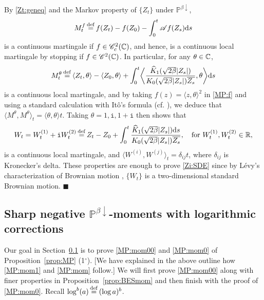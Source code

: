 \documentclass[12pt, twoside]{article}
\numberwithin{figure}{section}
\newcommand{\1}{\mathds 1}
\newcommand{\C}{{\mathscr C}}
\newcommand{\da}{{\downarrow}}
\newcommand{\la}{{\langle}}
\newcommand{\ra}{{\rangle}}
\newcommand{\ms}{\mathscr}
\renewcommand{\P}{{\mathbb P}}
\renewcommand{\d}{{\mathrm d}}
\newcommand{\R}{{\Bbb R}}
\newcommand{\2}{{\mathbf 1}}
\renewcommand{\i}{{\mathtt i}}
\newcommand{\defeq}{{\stackrel{\rm def}{=}}}
\renewenvironment{proof}[1][\proofname]{\noindent {\bfseries #1.}\;}{\hfill\ensuremath{\blacksquare}\\}
\newcommand{\cc}{{^\circ}}
\newcommand{\hK}{{\widehat{K}}}
\begin{document}
\begin{proof}[Proof of Proposition~\ref{prop:MP} (4$\cc$)]
By \eqref{Zt:geneq} and the Markov property of $\{Z_t\}$ under $\P^{\beta\da}$, 
\begin{align}\label{MP:f}
M_t^f\,\defeq \,f(Z_t)-f( Z_0) -\int_0^t\ms Af(Z_s)\d s
\end{align}
is a continuous martingale if $f\in \C_c^2(\Bbb C)$, and hence, is a continuous local martingale  by stopping if $f\in \C^2(\Bbb C)$. In particular, for any $\theta\in \Bbb C$,
\[
M^\theta_t\,\defeq\, \la Z_t,\theta\ra-\la Z_0,\theta\ra+\int_0^t 
 \biggl\langle\frac{\hK_1(\sqrt{2\beta}|Z_s|)}{K_0(\sqrt{2\beta}|Z_s|)\overline{Z_s}},\theta\biggr\rangle
\d s
\]
is a continuous local martingale, and by taking $f(z)=\la z,\theta\ra^2$ in \eqref{MP:f} and using a standard calculation with It\^{o}'s formula (cf. \cite[the proof of (i) $\Rightarrow$ (ii) of (2.4)~Proposition, p.297]{RY}), we deduce that $\la M^\theta,M^\theta\ra_t=\la \theta,\theta\rangle t$.  Taking $\theta=1,\i,1+\i$ then shows that
\[
W_t=W^{(1)}_t+\i W^{(2)}_t\,\defeq\, Z_t-Z_0+\int_0^t \frac{\hK_1(\sqrt{2\beta}|Z_s|)\d s}{K_0(\sqrt{2\beta}|Z_s|)\overline{Z_s}},\quad \mbox{for $W^{(1)}_t,W^{(2)}_t\in \R$},
\]
is a continuous local martingale, and $\la W^{(i)},W^{(j)}\ra_t=\delta_{ij}t$, where $\delta_{ij}$ is Kronecker's delta. These properties are enough to prove 
 \eqref{Zi:SDE} since by L\'evy's characterization of Brownian motion \cite[3.16 Theorem, p.157]{KS:BM}, $\{W_t\}$ is a two-dimensional standard Brownian motion. 
\end{proof}


\subsection{Sharp negative $\P^{\beta\da}$-moments with logarithmic corrections}\label{sec:sharpmom}
Our goal in Section~\ref{sec:sharpmom} is to prove \eqref{MP:mom00} and \eqref{MP:mom0} of Proposition~\ref{prop:MP} (1$\cc$). [We have explained in the above outline how \eqref{MP:mom1} and \eqref{MP:mom} follow.] 
 We will first prove \eqref{MP:mom00} along with finer properties in Proposition~\ref{prop:BESmom} and then finish with the proof of \eqref{MP:mom0}.
Recall $\log^b(a)\,\defeq\, (\log a)^b$.
\end{document}
